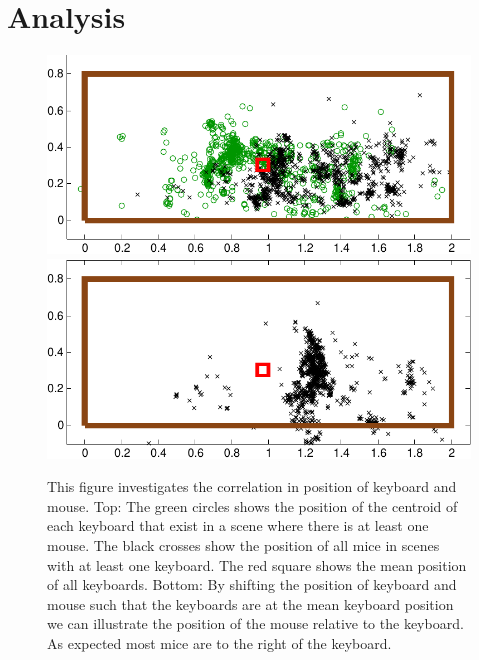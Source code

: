 \documentclass[letterpaper, 10 pt, conference]{ieeeconf}  %
\begin{document}

\section{Analysis}
\label{sec:Analysis}




\begin{figure}
\begin{center}
\includegraphics[width=0.8\linewidth]{keyboard_mouse_raw-crop}
\includegraphics[width=0.8\linewidth]{keyboard_mouse-crop}
\end{center}
\label{fig:scatter-keyboard-mouse}
\caption{This figure investigates the correlation in position of keyboard and mouse. Top: The green circles shows the position of the centroid of each keyboard that exist in a scene where there is at least one mouse. The black crosses show the position of all mice in scenes with at least one keyboard. The red square shows the mean position of all keyboards. Bottom: By shifting the position of keyboard and mouse such that the keyboards are at the mean keyboard position we can illustrate the position of the mouse relative to the keyboard. As expected most mice are to the right of the keyboard.} 
\end{figure}
\end{document}
